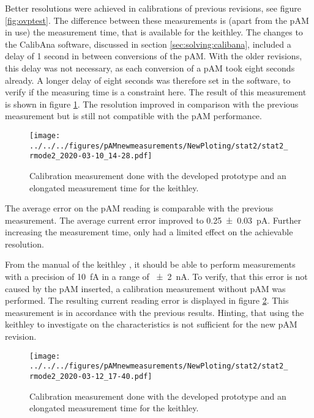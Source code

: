 Better resolutions were achieved in calibrations of previous revisions, see figure \ref{fig:ovptest}. The difference between these measurements is (apart from the \ac{pAM} in use) the measurement time, that is available for the \ac{keithley}.
The changes to the CalibAna software, discussed in section \ref{sec:solving:calibana}, included a delay of 1 second in between conversions of the \ac{pAM}. With the older revisions, this delay was not necessary, as each conversion of a \ac{pAM} took eight seconds already.
A longer delay of eight seconds was therefore set in the software, to verify if the measuring time is a constraint here. The result of this measurement is shown in figure \ref{fig:meas:2}. The resolution improved in comparison with the previous measurement but is still not compatible with the \ac{pAM} performance.
\begin{figure} 
	\centering
	\texttt{[image: ../../../figures/pAMnewmeasurements/NewPloting/stat2/stat2\_rmode2\_2020-03-10\_14-28.pdf]}
	\caption{Calibration measurement done with the developed prototype and an elongated measurement time for the \ac{keithley}.}
	\label{fig:meas:2}
\end{figure}
The average error on the \ac{pAM} reading is comparable with the previous measurement. The average current error improved to \SI{0.25\pm0.03}{\pico\ampere}. Further increasing the measurement time, only had a limited effect on the achievable resolution.

From the manual of the \acl{keithley} \cite{keithley}, it should be able to perform measurements with a precision of \SI{10}{\femto\ampere} in a range of \SI{\pm2}{\nano\ampere}. To verify, that this error is not caused by the \ac{pAM} inserted, a calibration measurement without \ac{pAM} was performed. The resulting current reading error is displayed in figure \ref{fig:meas:3:keyerr}. This measurement is in accordance with the previous results. Hinting, that using the \ac{keithley} to investigate on the characteristics is not sufficient for the new \ac{pAM} revision.
\begin{figure} 
	\centering
	\texttt{[image: ../../../figures/pAMnewmeasurements/NewPloting/stat2/stat2\_rmode2\_2020-03-12\_17-40.pdf]}
	\caption{Calibration measurement done with the developed prototype and an elongated measurement time for the \ac{keithley}.}
	\label{fig:meas:3:keyerr}
\end{figure}
